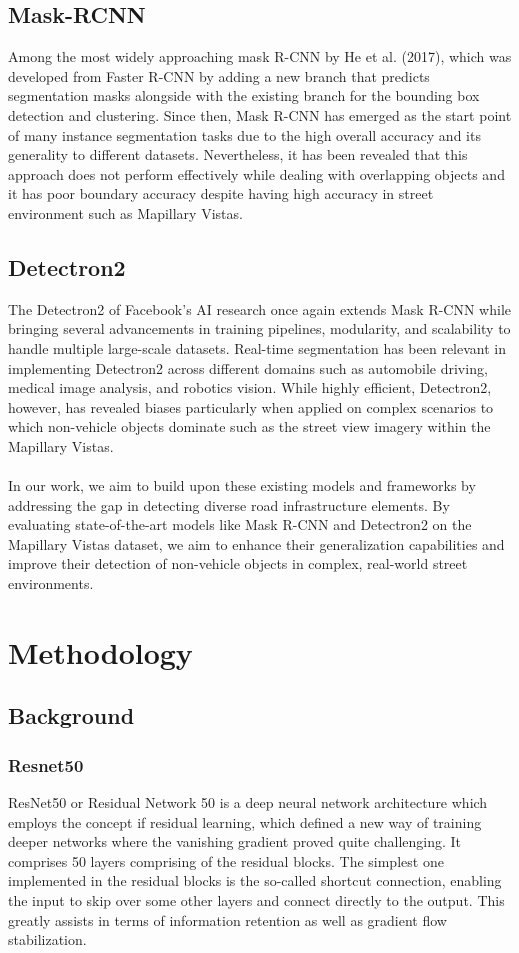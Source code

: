 \documentclass[conference]{IEEEtran}
\begin{document}
\subsection{Mask-RCNN}
Among the most widely approaching mask R-CNN by He et al. (2017), which was developed from Faster R-CNN by adding a new branch that predicts segmentation masks alongside with the existing branch for the bounding box detection and clustering. Since then, Mask R-CNN has emerged as the start point of many instance segmentation tasks due to the high overall accuracy and its generality to different datasets. Nevertheless, it has been revealed that this approach does not perform effectively while dealing with overlapping objects and it has poor boundary accuracy despite having high accuracy in street environment such as Mapillary Vistas.
\\
\subsection{Detectron2}
The Detectron2 of Facebook's AI research once again extends Mask R-CNN while bringing several advancements in training pipelines, modularity, and scalability to handle multiple large-scale datasets. Real-time segmentation has been relevant in implementing Detectron2 across different domains such as automobile driving, medical image analysis, and robotics vision. While highly efficient, Detectron2, however, has revealed biases particularly when applied on complex scenarios to which non-vehicle objects dominate such as the street view imagery within the Mapillary Vistas.
\\
\\
In our work, we aim to build upon these existing models and frameworks by addressing the gap in detecting diverse road infrastructure elements. By evaluating state-of-the-art models like Mask R-CNN and Detectron2 on the Mapillary Vistas dataset, we aim to enhance their generalization capabilities and improve their detection of non-vehicle objects in complex, real-world street environments.

\section{Methodology}
\subsection{Background}
\subsubsection{Resnet50}
ResNet50 or Residual Network 50 is a deep neural network architecture which employs the concept if residual learning, which defined a new way of training deeper networks where the vanishing gradient proved quite challenging. It comprises 50 layers comprising of the residual blocks. The simplest one implemented in the residual blocks is the so-called shortcut connection, enabling the input to skip over some other layers and connect directly to the output. This greatly assists in terms of information retention as well as gradient flow stabilization.
\end{document}
